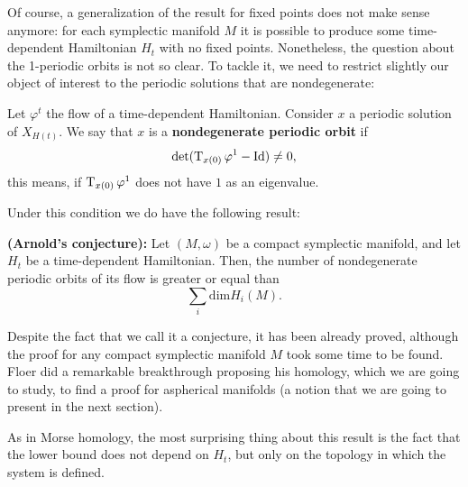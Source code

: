 Of course, a generalization of the result for fixed points does not make sense anymore: for each symplectic manifold $M$ it is possible to produce some time-dependent Hamiltonian $H_t$ with no fixed points. Nonetheless, the question about the 1-periodic orbits is not so clear. To tackle it, we need to restrict slightly our object of interest to the periodic solutions that are nondegenerate:

\begin{deff}
Let $\varphi^t$ the flow of a time-dependent Hamiltonian. Consider $x$ a periodic solution of $X_{H(t)}$. We say that $x$ is a {\bf nondegenerate periodic orbit} if
\[\det(\operatorname T_{x(0)} \varphi^1 - \text{Id}) \neq 0 ,\]
this means, if $\operatorname T_{x(0)} \varphi^1$ does not have $1$ as an eigenvalue.
\end{deff}

Under this condition we do have the following result:

\begin{theo}
{\bf (Arnold's conjecture):} Let $(M,\omega)$ be a compact symplectic manifold, and let $H_t$ be a time-dependent Hamiltonian. Then, the number of nondegenerate periodic orbits of its flow is greater or equal than
\[\sum_i \mathrm{dim}H_i(M) .\]
\end{theo}

Despite the fact that we call it a conjecture, it has been already proved, although the proof for any compact symplectic manifold $M$ took some time to be found. Floer did a remarkable breakthrough proposing his homology, which we are going to study, to find a proof for aspherical manifolds (a notion that we are going to present in the next section).

As in Morse homology, the most surprising thing about this result is the fact that the lower bound does not depend on $H_t$, but only on the topology in which the system is defined.
